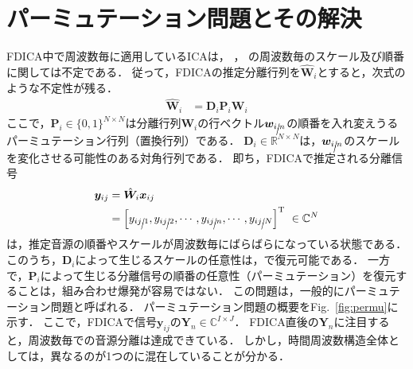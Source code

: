\section{パーミュテーション問題とその解決}
\label{sec:pp}
FDICA中で周波数毎に適用しているICAは，
，
の周波数毎のスケール及び順番に関しては不定である．
従って，FDICAの推定分離行列を$\hat{\bm{W}}_i$とすると，次式のような不定性が残る．
\begin{align}
	\hat{\bm{W}}_{i} &= \bm{D}_{i}\bm{P}_{i}  \bm{W}_{i} \label{eq:w_fdica}
\end{align}
ここで，$\bm{P}_i \in \{0, 1\}^{N \times N}$は分離行列$\bm{W}_{i}$の行ベクトル$\bm{w}_{i\cancel{,} n}$の順番を入れ変えうるパーミュテーション行列（置換行列）である．
$\bm{D}_i \in \mathbb{R}^{N \times N}$は，$\bm{w}_{i\cancel{,}n}$のスケールを変化させる可能性のある対角行列である．
即ち，FDICAで推定される分離信号
\begin{align}
\bm{y}_{ij} &= \hat{\bm{W}}_i\bm{x}_{ij} \\
&=\left[ y_{ij\cancel{,}1},y_{ij\cancel{,}2}, \cdots, y_{ij\cancel{,}n}, \cdots, y_{ij\cancel{,}N} \right]^\mathrm{T}~\in \mathbb{C}^{N} \label{eq:sepSig}
\end{align}
は，推定音源の順番やスケールが周波数毎にばらばらになっている状態である．
このうち，$\bm{D}_i$によって生じるスケールの任意性は，\cite{Matsuoka2001_PB}で復元可能である．
一方で，$\bm{P}_i$によって生じる分離信号の順番の任意性（パーミュテーション）を復元することは，組み合わせ爆発が容易ではない．
この問題は，一般的にパーミュテーション問題と呼ばれる．
パーミュテーション問題の概要をFig.~\ref{fig:permu}に示す．
ここで，FDICAで信号$\bm{y}_{ij}$の$\bm{Y}_n \in \mathbb{C}^{I \times J}$．
FDICA直後の$\bm{Y}_n$に注目すると，周波数毎での音源分離は達成できている．
しかし，時間周波数構造全体としては，異なるのが1つのに混在していることが分かる．
